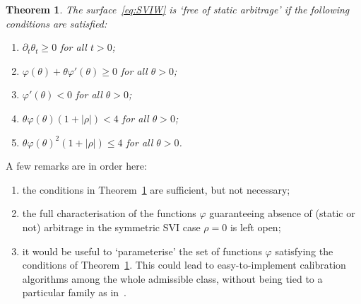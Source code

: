 \documentclass{amsart}[11pt]
\numberwithin{equation}{section}
\newtheorem{theorem}{Theorem}[section]
\theoremstyle{definition}
\begin{document}
\begin{theorem} \label{theogj}
The surface~\eqref{eq:SVIW} is `free of static arbitrage' if the following conditions are satisfied:
\begin{enumerate}
  \item $\partial_t \theta_t\geq 0$ for all $t>0$;
  \item $\varphi(\theta)+\theta\varphi'(\theta)\geq 0$ for all $\theta>0$;
  \item $\varphi'(\theta) < 0$ for all $\theta>0$;
  \item $\theta\varphi(\theta)(1+|\rho|) < 4$ for all $\theta>0$;
  \item $\theta\varphi(\theta)^2(1+|\rho|)\leq 4$ for all $\theta>0$.
\end{enumerate}
\end{theorem}
A few remarks are in order here:
\begin{enumerate}
\item the conditions in Theorem~\ref{theogj} are sufficient, but not necessary;
\item the full characterisation of the functions $\varphi$ guaranteeing absence of (static or not) arbitrage 
in the symmetric SVI case $\rho=0$ is left open;
\item it would be useful to `parameterise' the set of functions $\varphi$ satisfying the conditions of Theorem~\ref{theogj}. 
This could lead to easy-to-implement calibration
algorithms among the whole admissible class, without being tied to a particular family as in~\cite{gj}.
\end{enumerate}
\end{document}
